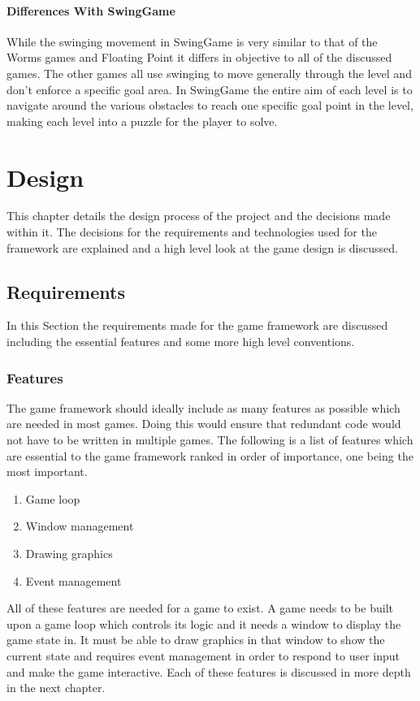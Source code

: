 \documentclass[]{report}
\begin{document}
			\subsubsection{Differences With SwingGame}
			While the swinging movement in SwingGame is very similar to that of the Worms games and Floating Point it differs in objective to all of the discussed games. The other games all use swinging to move generally through the level and don't enforce a specific goal area. In SwingGame the entire aim of each level is to navigate around the various obstacles to reach one specific goal point in the level, making each level into a puzzle for the player to solve.

\chapter{Design}
This chapter details the design process of the project and the decisions made within it. The decisions for the requirements and technologies used for the framework are explained and a high level look at the game design is discussed.
	\section{Requirements}
	In this Section the requirements made for the game framework are discussed including the essential features and some more high level conventions.
		\subsection{Features}
		The game framework should ideally include as many features as possible which are needed in most games. Doing this would ensure that redundant code would not have to be written in multiple games. The following is a list of features which are essential to the game framework ranked in order of importance, one being the most important.
		\begin{enumerate}
			\item{Game loop}
			\item{Window management}
			\item{Drawing graphics}
			\item{Event management}
		\end{enumerate}
		All of these features are needed for a game to exist. A game needs to be built upon a game loop which controls its logic and it needs a window to display the game state in. It must be able to draw graphics in that window to show the current state and requires event management in order to respond to user input and make the game interactive. Each of these features is discussed in more depth in the next chapter.
		
\end{document}
